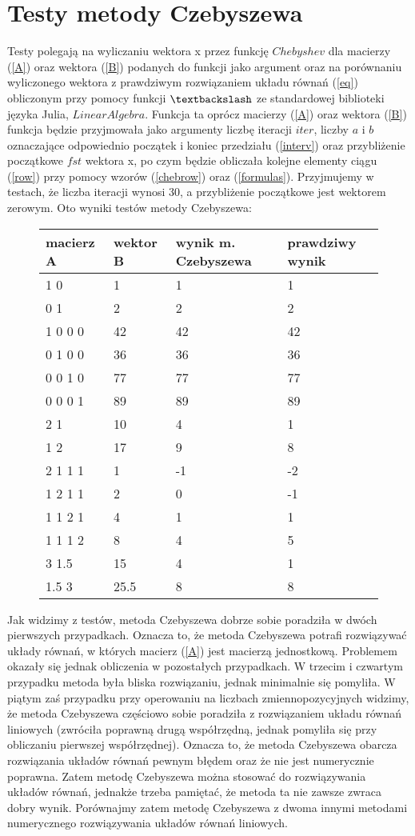 \documentclass[a4paper]{article}
\begin{document}
\section{Testy metody Czebyszewa}
Testy polegają na wyliczaniu wektora x przez funkcję $Chebyshev$ dla macierzy (\ref{A}) oraz wektora (\ref{B}) podanych do funkcji jako argument oraz na porównaniu wyliczonego wektora z prawdziwym rozwiązaniem układu równań (\ref{eq}) obliczonym przy pomocy funkcji $\textbackslash$ ze standardowej biblioteki języka Julia, $Linear Algebra$. Funkcja ta oprócz macierzy (\ref{A}) oraz wektora (\ref{B}) funkcja będzie przyjmowała jako argumenty liczbę iteracji $iter$, liczby $a$ i $b$ oznaczające odpowiednio początek i koniec przedziału (\ref{interv}) oraz przybliżenie początkowe $fst$ wektora x, po czym będzie obliczała kolejne elementy ciągu (\ref{row}) przy pomocy wzorów (\ref{chebrow}) oraz (\ref{formulas}). Przyjmujemy w testach, że liczba iteracji wynosi 30, a przybliżenie początkowe jest wektorem zerowym. Oto wyniki testów metody Czebyszewa:
\begin{figure}[H]
\begin{tabular}{|l|l|l|l|}
\hline
macierz A & wektor B & wynik m. Czebyszewa & prawdziwy wynik \\
\hline
1 0 & 1 & 1 & 1 \\
0 1 & 2 & 2 & 2 \\
\hline
1 0 0 0 & 42 & 42 & 42 \\ 
0 1 0 0 & 36 & 36 & 36 \\
0 0 1 0 & 77 & 77 & 77 \\
0 0 0 1 & 89 & 89 & 89 \\
\hline
2 1 & 10 & 4 & 1 \\
1 2 & 17 & 9 & 8 \\
\hline
2 1 1 1 & 1 & -1 & -2 \\
1 2 1 1 & 2 & 0 & -1 \\
1 1 2 1 & 4 & 1 & 1 \\
1 1 1 2 & 8 & 4 & 5 \\
\hline
3   1.5 & 15 & 4 & 1 \\
1.5 3 & 25.5 & 8 & 8 \\
\hline
\end{tabular}
\end{figure}
Jak widzimy z testów, metoda Czebyszewa dobrze sobie poradziła w dwóch pierwszych przypadkach. Oznacza to, że metoda Czebyszewa potrafi rozwiązywać układy równań, w których macierz (\ref{A}) jest macierzą jednostkową. Problemem okazały się jednak obliczenia w pozostałych przypadkach. W trzecim i czwartym przypadku metoda była bliska rozwiązaniu, jednak minimalnie się pomyliła. W piątym zaś przypadku przy operowaniu na liczbach zmiennopozycyjnych widzimy, że metoda Czebyszewa częściowo sobie poradziła z rozwiązaniem układu równań liniowych (zwróciła poprawną drugą współrzędną, jednak pomyliła się przy obliczaniu pierwszej współrzędnej). Oznacza to, że metoda Czebyszewa obarcza rozwiązania układów równań pewnym błędem oraz że nie jest numerycznie poprawna. Zatem metodę Czebyszewa można stosować do rozwiązywania układów równań, jednakże trzeba pamiętać, że metoda ta nie zawsze zwraca dobry wynik. Porównajmy zatem metodę Czebyszewa z dwoma innymi metodami numerycznego rozwiązywania układów równań liniowych.  
\end{document}

